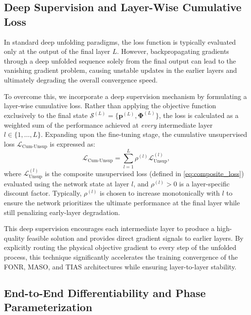 \documentclass[journal]{IEEEtran}
\begin{document}
\subsection{Deep Supervision and Layer-Wise Cumulative Loss}
\label{subsec:deep_supervision}

In standard deep unfolding paradigms, the loss function is typically evaluated only at the output of the final layer $L$. However, backpropagating gradients through a deep unfolded sequence solely from the final output can lead to the vanishing gradient problem, causing unstable updates in the earlier layers and ultimately degrading the overall convergence speed. 

To overcome this, we incorporate a deep supervision mechanism by formulating a layer-wise cumulative loss. Rather than applying the objective function exclusively to the final state $\mathcal{S}^{(L)} = \{ \mathbf{p}^{(L)}, \boldsymbol{\Phi}^{(L)} \}$, the loss is calculated as a weighted sum of the performance achieved at \textit{every} intermediate layer $l \in \{1, \dots, L\}$. Expanding upon the fine-tuning stage, the cumulative unsupervised loss $\mathcal{L}_{\text{Cum-Unsup}}$ is expressed as:
\begin{equation}
    \mathcal{L}_{\text{Cum-Unsup}} = \sum_{l=1}^L \rho^{(l)} \mathcal{L}_{\text{Unsup}}^{(l)},
\end{equation}
where $\mathcal{L}_{\text{Unsup}}^{(l)}$ is the composite unsupervised loss (defined in \eqref{eq:composite_loss}) evaluated using the network state at layer $l$, and $\rho^{(l)} > 0$ is a layer-specific discount factor. Typically, $\rho^{(l)}$ is chosen to increase monotonically with $l$ to ensure the network prioritizes the ultimate performance at the final layer while still penalizing early-layer degradation.

This deep supervision encourages each intermediate layer to produce a high-quality feasible solution and provides direct gradient signals to earlier layers. By explicitly routing the physical objective gradient to every step of the unfolded process, this technique significantly accelerates the training convergence of the FONR, MASO, and TIAS architectures while ensuring layer-to-layer stability.

\subsection{End-to-End Differentiability and Phase Parameterization}
\label{subsec:differentiability}
\end{document}
